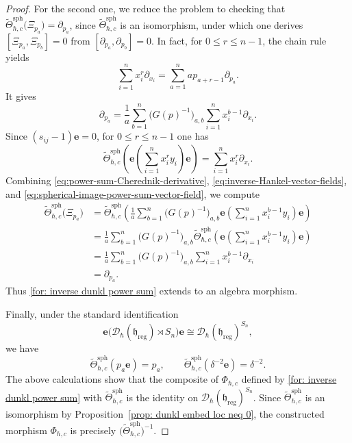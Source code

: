 \documentclass[10pt,a4paper]{amsart}
\newcommand{\be}{\mathbf{e}}
\newcommand{\fkh}{\mathfrak{h}}
\newcommand{\mD}{\mathcal{D}}
\newcommand{\reg}{\mathrm{reg}}
\newcommand{\sph}{{\mathrm{sph}}}
\begin{document}
\begin{proof}
	For the second one,
	we reduce the problem to checking that \(\widetilde{\Theta}_{\hbar,c}^{\sph}
	\bigl( \Xi_{p_a} \bigr)
	 = \partial_{p_a}\),
	 since \(\widetilde{\Theta}_{\hbar,c}^{\sph}\) is an isomorphism, under which one derives \([\Xi_{p_a}, \Xi_{p_b}] = 0\) from \([\partial_{p_a}, \partial_{p_b}] = 0\). 
	In fact, 
	for \(0\leq r\leq n-1\), the chain rule yields
	\[
	  \sum_{i=1}^n x_i^r\partial_{x_i}
	  =
	  \sum_{a=1}^n
	  a p_{a+r-1}\partial_{p_a}.
	\]
	It gives
	\begin{equation}\label{eq:inverse-Hankel-vector-fields}
	  \partial_{p_a}
	  =
	  \frac{1}{a}\sum_{b=1}^n
	  \bigl(G(p)^{-1}\bigr)_{a, b}
	  \sum_{i=1}^n x_i^{b-1}\partial_{x_i}.
	\end{equation}
	Since \((s_{ij}-1)\be=0\), for \(0\leq r\leq n-1\) one has
	\begin{equation}\label{eq:spherical-image-power-sum-vector-field}
	  \widetilde\Theta_{\hbar,c}^{\sph}
	  \left(
	    \be\left(\sum_{i=1}^n x_i^r y_i\right)\be
	  \right)
	  =
	  \sum_{i=1}^n x_i^r\partial_{x_i}.
	\end{equation}
	Combining \eqref{eq:power-sum-Cherednik-derivative},
	\eqref{eq:inverse-Hankel-vector-fields}, and
	\eqref{eq:spherical-image-power-sum-vector-field}, we compute
	\[
	\begin{aligned}
	\widetilde{\Theta}_{\hbar,c}^{\sph}
	\bigl( \Xi_{p_a} \bigr)
	&=
	\widetilde{\Theta}_{\hbar,c}^{\sph}
	\left(
	\frac{1}{a}
	\sum_{b=1}^n
	\bigl(G(p)^{-1}\bigr)_{a, b}
	\be
	\left(
	\sum_{i=1}^n x_i^{b-1}y_i
	\right)
	\be
	\right)\\
	&=
	\frac{1}{a}
	\sum_{b=1}^n
	\bigl(G(p)^{-1}\bigr)_{a, b}
	\widetilde{\Theta}_{\hbar,c}^{\sph}
	\left(
	\be
	\left(
	\sum_{i=1}^n x_i^{b-1}y_i
	\right)
	\be
	\right)\\
	&=
	\frac{1}{a}
	\sum_{b=1}^n
	\bigl(G(p)^{-1}\bigr)_{a, b}
	\sum_{i=1}^n x_i^{b-1}\partial_{x_i}\\
	&=
	\partial_{p_a}.
	\end{aligned}
	\]
	Thus
	\eqref{for: inverse dunkl power sum} extends to an algebra morphism.
	
	
	Finally, under the standard identification
	\[
	\be\bigl(\mD_\hbar(\fkh_{\reg})\rtimes S_n\bigr)\be
	\cong
	\mD_\hbar(\fkh_{\reg})^{S_n},
	\]
	we have
	\begin{equation}\label{eq:spherical-dunkl-on-functions}
	\widetilde{\Theta}_{\hbar,c}^{\sph}(p_a\be)=p_a,
	\qquad
	\widetilde{\Theta}_{\hbar,c}^{\sph}(\delta^{-2}\be)=\delta^{-2}.
	\end{equation}
	The above calculations show
	that the composite of \(\Phi_{\hbar, c}\) defined by
	\eqref{for: inverse dunkl power sum} with
	\(\widetilde\Theta_{\hbar,c}^{\sph}\) is the identity on \(\mD_\hbar(\fkh_{\reg})^{S_n}\). Since
	\(\widetilde\Theta_{\hbar,c}^{\sph}\) is an isomorphism by
	Proposition~\ref{prop: dunkl embed loc neq 0}, the constructed morphism \(\Phi_{\hbar,c}\)
	is precisely
	\(\bigl(\widetilde\Theta_{\hbar,c}^{\sph}\bigr)^{-1}\).
\end{proof}
\end{document}
